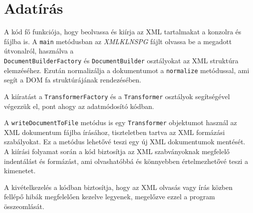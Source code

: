\documentclass[12pt]{report}
\begin{document}
\section{Adatírás}
\indent\indent A kód fő funkciója, hogy beolvassa és kiírja az XML tartalmakat a konzolra és fájlba is. A \texttt{main} metódusban az \textit{XMLKLNSPG} fájlt olvassa be a megadott útvonalról, használva a \\ \texttt{DocumentBuilderFactory} és \texttt{DocumentBuilder} osztályokat az XML struktúra elemzéséhez. Ezután normalizálja a dokumentumot a \texttt{normalize} metódussal, ami segít a DOM fa struktúrájának rendezésében.

A kiíratást a \texttt{TransformerFactory} és a \texttt{Transformer} osztályok segítségével végezzük el, pont ahogy az adatmódosító kódban.

A \texttt{writeDocumentToFile} metódus is egy \texttt{Transformer} objektumot használ az XML dokumentum fájlba írásához, tiszteletben tartva az XML formázási szabályokat. Ez a metódus lehetővé teszi egy új XML dokumentumok mentését. A kiírási folyamat során a kód biztosítja az XML szabványoknak megfelelő indentálást és formázást, ami olvashatóbbá és könnyebben értelmezhetővé teszi a kimenetet.

A kivételkezelés a kódban biztosítja, hogy az XML olvasás vagy írás közben fellépő hibák megfelelően kezelve legyenek, megelőzve ezzel a program összeomlását.\\
\end{document}

